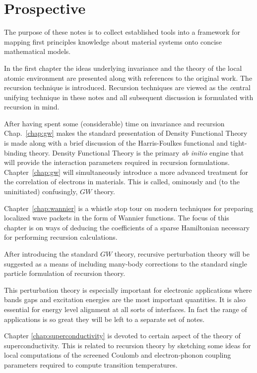 \section{Prospective}
The purpose of these notes is to collect established tools into 
a framework for mapping first principles knowledge about material systems 
onto concise mathematical models. 

In the first chapter the ideas underlying invariance and the 
theory of the local atomic environment are presented along with references
to the original work. The recursion technique is introduced. 
Recursion techniques are viewed as the {\emph central unifying technique} in these
notes and all subsequent discussion is formulated with recursion in mind.

After having spent some (considerable) time on invariance and recursion
Chap.~\ref{chap:gw} makes the standard presentation of Density Functional Theory is made along 
with a brief discussion of the Harris-Foulkes functional and tight-binding theory. 
Density Functional Theory is the primary {\it ab initio} engine that will 
provide the interaction parameters required in recursion formulations.
Chapter~\ref{chap:gw} will simultaneously introduce a more advanced 
treatment for the correlation of electrons in materials.
This is called, ominously and (to the uninitiated) confusingly, $GW$ theory.

Chapter~\ref{chap:wannier} is a whistle stop tour 
on modern techniques for preparing localized wave packets in the 
form of Wannier functions. The focus of this chapter is on 
ways of deducing the coefficients of a sparse Hamiltonian
necessary for performing recursion calculations.

After introducing the standard $GW$ theory, recursive perturbation theory
will be suggested as a means of including many-body corrections 
to the standard single particle formulation of recursion theory. 

This perturbation theory is especially important for electronic 
applications where bands gaps and excitation energies 
are the most important quantities. It is also essential for
energy level alignment at all sorts of interfaces. In fact the range
of applications is so great they will be left to a separate set of notes.

Chapter \ref{chap:superconductivity} is devoted to
certain aspect of the theory of superconductivity. 
This is related to recursion theory by sketching some ideas for 
local computations of the screened Coulomb and electron-phonon
coupling parameters required to compute transition temperatures.

